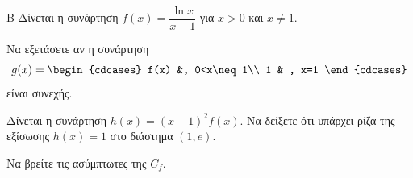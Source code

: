 \begin{thema}{Β}
Δίνεται η συνάρτηση $f(x) = \dfrac{\ln x}{x-1}$ για $x > 0$ και $x \ne 1$.
\begin{erwthma}
\item Να εξετάσετε αν η συνάρτηση
\[g(x)=\begin{cdcases}
f(x) &, 0<x\neq 1\\ 1 & , x=1
\end{cdcases}\]
είναι συνεχής.
\item Δίνεται η συνάρτηση $h(x) = (x-1)^2f(x)$. Να δείξετε ότι υπάρχει ρίζα της εξίσωσης $h(x) = 1$ στο διάστημα $(1, e)$.
\item Να βρείτε τις ασύμπτωτες της $C_f$.
\end{erwthma}
\end{thema}
